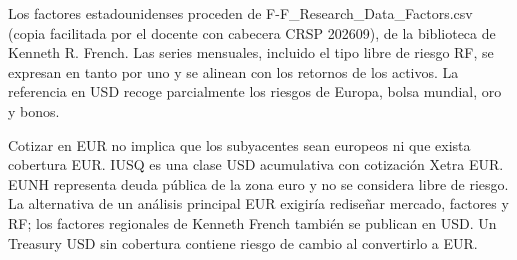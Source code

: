\documentclass[11pt,a4paper]{article}
\begin{document}
Los factores estadounidenses proceden de F-F\_Research\_Data\_Factors.csv (copia facilitada por el docente con cabecera CRSP 202609), de la biblioteca de Kenneth R. French. Las series mensuales, incluido el tipo libre de riesgo RF, se expresan en tanto por uno y se alinean con los retornos de los activos. La referencia en USD recoge parcialmente los riesgos de Europa, bolsa mundial, oro y bonos.

Cotizar en EUR no implica que los subyacentes sean europeos ni que exista cobertura EUR. IUSQ es una clase USD acumulativa con cotización Xetra EUR. EUNH representa deuda pública de la zona euro y no se considera libre de riesgo. La alternativa de un análisis principal EUR exigiría rediseñar mercado, factores y RF; los factores regionales de Kenneth French también se publican en USD. Un Treasury USD sin cobertura contiene riesgo de cambio al convertirlo a EUR.
\end{document}
